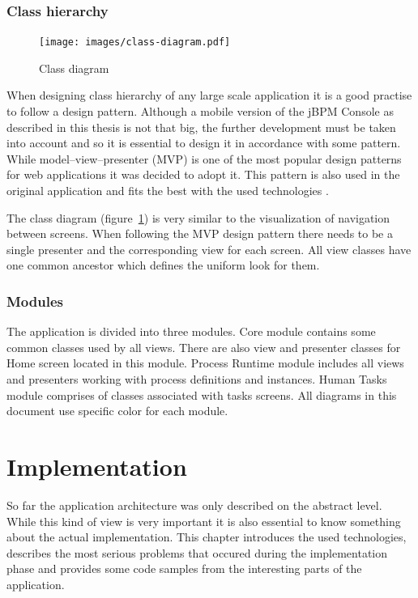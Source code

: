 \documentclass[12pt,oneside,final]{fithesis2}
\begin{document}
\subsection{Class hierarchy}

\begin{figure}[ht!]
\centering
\texttt{[image: images/class-diagram.pdf]}
\caption{Class diagram}
\label{fig:class-diagram}
\end{figure}

When designing class hierarchy of any large scale application it is a good practise to follow a design pattern.
Although a mobile version of the jBPM Console as described in this thesis is not that big, the further development must be taken into account and so it is essential to design it in accordance with some pattern.
While model–view–presenter (MVP) is one of the most popular design patterns for web applications it was decided to adopt it.
This pattern is also used in the original application and fits the best with the used technologies \cite{ramsdale10}.

The class diagram (figure~\ref{fig:class-diagram}) is very similar to the visualization of navigation between screens.
When following the MVP design pattern there needs to be a single presenter and the corresponding view for each screen.
All view classes have one common ancestor which defines the uniform look for them.

\subsection{Modules}
The application is divided into three modules.
Core module contains some common classes used by all views.
There are also view and presenter classes for Home screen located in this module.
Process Runtime module includes all views and presenters working with process definitions and instances.
Human Tasks module comprises of classes associated with tasks screens.
All diagrams in this document use specific color for each module.

\chapter{Implementation}
So far the application architecture was only described on the abstract level.
While this kind of view is very important it is also essential to know something about the actual implementation.
This chapter introduces the used technologies, describes the most serious problems that occured during the implementation phase and provides some code samples from the interesting parts of the application.
\end{document}
